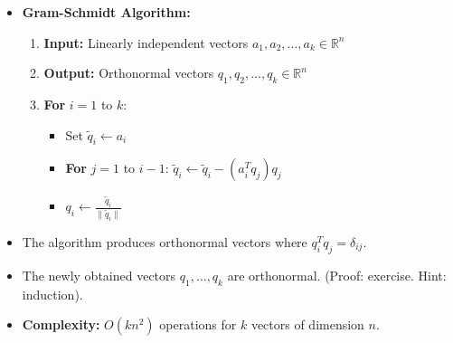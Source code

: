 \begin{frame}
    \begin{itemize}
        \item \textbf{Gram-Schmidt Algorithm:}
        \begin{enumerate}
            \item \textbf{Input:} Linearly independent vectors $a_1, a_2, \ldots, a_k \in \mathbb{R}^n$
            \item \textbf{Output:} Orthonormal vectors $q_1, q_2, \ldots, q_k \in \mathbb{R}^n$
            \item \textbf{For} $i = 1$ to $k$:
            \begin{itemize}
                \item Set $\tilde{q}_i \leftarrow a_i$
                \item \textbf{For} $j = 1$ to $i-1$: $\tilde{q}_i \leftarrow \tilde{q}_i - (a_i^T q_j) q_j$
                \item $q_i \leftarrow \frac{\tilde{q}_i}{\|\tilde{q}_i\|}$
            \end{itemize}
        \end{enumerate}
        \item The algorithm produces orthonormal vectors where $q_i^T q_j = \delta_{ij}$.
         \item The newly obtained vectors $q_1, \ldots, q_k$ are orthonormal. (Proof: exercise. Hint: induction).
        \item \textbf{Complexity:} $O(kn^2)$ operations for $k$ vectors of dimension $n$.
    \end{itemize}
\end{frame}

